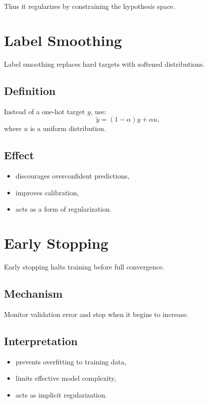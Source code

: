 Thus it regularizes by constraining the hypothesis space.

\section{Label Smoothing}

Label smoothing replaces hard targets with softened distributions.

\subsection{Definition}

Instead of a one-hot target $y$, use:
\[
\tilde{y} = (1-\alpha)y + \alpha u,
\]
where $u$ is a uniform distribution.

\subsection{Effect}

\begin{itemize}
    \item discourages overconfident predictions,
    \item improves calibration,
    \item acts as a form of regularization.
\end{itemize}

\section{Early Stopping}

Early stopping halts training before full convergence.

\subsection{Mechanism}

Monitor validation error and stop when it begins to increase.

\subsection{Interpretation}

\begin{itemize}
    \item prevents overfitting to training data,
    \item limits effective model complexity,
    \item acts as implicit regularization.
\end{itemize}

